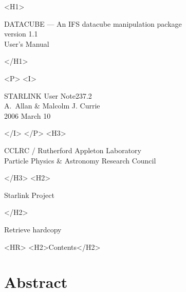 \documentclass[twoside,11pt]{article}
\newcommand{\stardoccategory}  {STARLINK User Note}
\newcommand{\stardocsource}    {sun\stardocnumber}
\newcommand{\stardocnumber}    {237.2}
\newcommand{\stardocauthors}   {A.~Allan \& Malcolm J. Currie}
\newcommand{\stardocdate}      {2006 March 10}
\newcommand{\stardoctitle}     {DATACUBE --- An IFS datacube manipulation package}
\newcommand{\stardocversion}   {version 1.1}
\newcommand{\stardocmanual}    {User's Manual}
\newcommand{\htmladdnormallink}[2]{#1}
\newcommand{\htmladdimg}[1]{}
\newcommand{\htmlref}[2]{#1}
\newcommand{\htmladdtonavigation}[1]{}
\newcommand{\xlabel}[1]{}
\newcommand{\latexonlytoc}[0]{\tableofcontents}
\begin{document}
\begin{htmlonly}
   \xlabel{}
   \begin{rawhtml} <H1> \end{rawhtml}
      \stardoctitle\\
      \stardocversion\\
      \stardocmanual
   \begin{rawhtml} </H1> \end{rawhtml}

   \htmladdimg{sun237_cover.gif}


   \begin{rawhtml} <P> <I> \end{rawhtml}
   \stardoccategory \stardocnumber \\
   \stardocauthors \\
   \stardocdate
   \begin{rawhtml} </I> </P> <H3> \end{rawhtml}
      \htmladdnormallink{CCLRC}{http://www.cclrc.ac.uk} /
      \htmladdnormallink{Rutherford Appleton Laboratory}
                        {http://www.cclrc.ac.uk/ral} \\
      \htmladdnormallink{Particle Physics \& Astronomy Research Council}
                        {http://www.pparc.ac.uk} \\
   \begin{rawhtml} </H3> <H2> \end{rawhtml}
      \htmladdnormallink{Starlink Project}{http://star-www.rl.ac.uk/}
   \begin{rawhtml} </H2> \end{rawhtml}
   \htmladdnormallink{\htmladdimg{source.gif} Retrieve hardcopy}
      {http://star-www.rl.ac.uk/cgi-bin/hcserver?\stardocsource}\\

  \label{stardoccontents}
  \begin{rawhtml} 
    <HR>
    <H2>Contents</H2>
  \end{rawhtml}
  \renewcommand{\latexonlytoc}[0]{}

  \section{\xlabel{abstract}Abstract}
\end{htmlonly}
\end{document}

